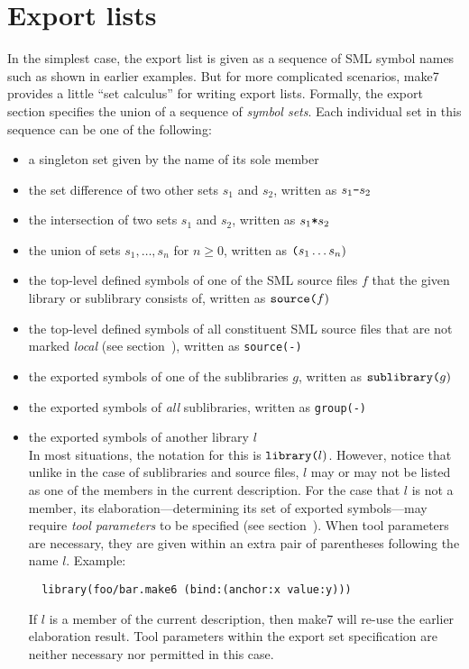 
\section{Export lists}
\label{sec:exportcalculus}

In the simplest case, the export list is given as a sequence of SML
symbol names such as shown in earlier examples.  But for more
complicated scenarios, make7 provides a little ``set calculus'' for
writing export lists.  Formally, the export section specifies the
union of a sequence of {\em symbol sets}.  Each individual set in this
sequence can be one of the following:

\begin{itemize}\setlength{\itemsep}{0pt}
\item a singleton set given by the name of its sole member
\item the set difference of two other sets $s_1$ and $s_2$, written as $s_1
\mbox{\tt -} s_2$
\item the intersection of two sets $s_1$ and $s_2$, written as $s_1
\mbox{\tt *} s_2$
\item the union of sets $s_1, \ldots, s_n$ for $n \ge 0$, written as
$\mbox{\tt (} s_1 \ldots s_n \mbox{)}$
\item the top-level defined symbols of one of the SML source files $f$
that the given library or sublibrary consists of, written as
$\mbox{\tt source(}f\mbox{)}$
\item the top-level defined symbols of all constituent SML source
files that are not marked {\em local} (see section~),
written as {\tt source(-)}
\item the exported symbols of one of the sublibraries $g$, written as
$\mbox{\tt sublibrary(}g\mbox{)}$
\item the exported symbols of {\em all} sublibraries, written as
{\tt group(-)}
\item the exported symbols of another library $l$ \\
In most situations, the notation for this is $\mbox{\tt library(}l\mbox{)}$.
However, notice that unlike in the case of sublibraries and source
files, $l$ may or may not be listed as one of the members in the
current description.  For the case that $l$ is not a member, its
elaboration---determining its set of exported symbols---may require
{\em tool parameters} to be specified (see
section~).  When tool parameters are necessary,
they are given within an extra pair of parentheses following the name
$l$.  Example:
\begin{verbatim}
  library(foo/bar.make6 (bind:(anchor:x value:y)))
\end{verbatim}
\noindent If $l$ is a member of the current description, then make7 will
re-use the earlier elaboration result.  Tool parameters within the
export set specification are neither necessary nor permitted in this case.
\end{itemize}


